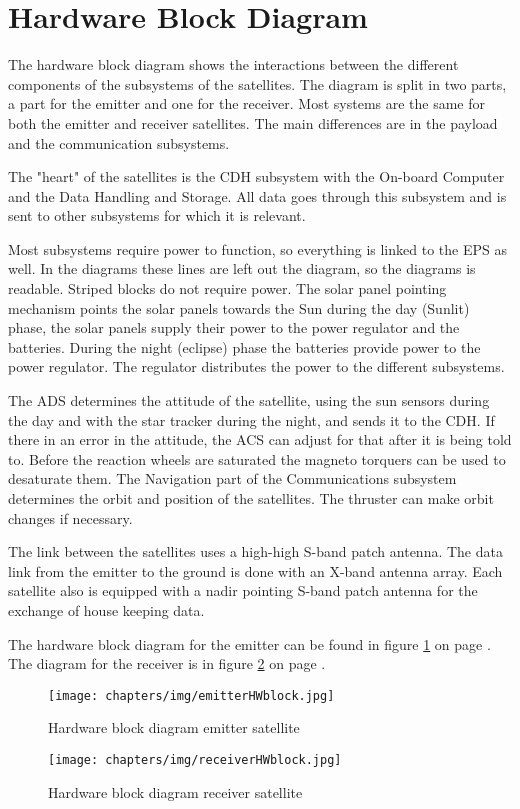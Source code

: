 \section{Hardware Block Diagram}
The hardware block diagram shows the interactions between the different components of the subsystems of the satellites. The diagram is split in two parts, a part for the emitter and one for the receiver. Most systems are the same for both the emitter and receiver satellites. The main differences are in the payload and the communication subsystems.

The "heart" of the satellites is the \ac{CDH} subsystem with the On-board Computer and the Data Handling and Storage. All data goes through this subsystem and is sent to other subsystems for which it is relevant. 

Most subsystems require power to function, so everything is linked to the \ac{EPS} as well. In the diagrams these lines are left out the diagram, so the diagrams is readable. Striped blocks do not require power. The solar panel pointing mechanism points the solar panels towards the Sun during the day (Sunlit) phase, the solar panels supply their power to the power regulator and the batteries. During the night (eclipse) phase the batteries provide power to the power regulator. The regulator distributes the power to the different subsystems.

The \ac{ADS} determines the attitude of the satellite, using the sun sensors during the day and with the star tracker during the night, and sends it to the \ac{CDH}. If there in an error in the attitude, the \ac{ACS} can adjust for that after it is being told to. Before the reaction wheels are saturated the magneto torquers can be used to desaturate them. The Navigation part of the Communications subsystem determines the orbit and position of the satellites. The thruster can make orbit changes if necessary.

The link between the satellites uses a high-high S-band patch antenna. The data link from the emitter to the ground is done with an X-band antenna array. Each satellite also is equipped with a nadir pointing S-band patch antenna for the exchange of house keeping data.

The hardware block diagram for the emitter can be found in figure \ref{HWblockemitter} on page \pageref{HWblockemitter}. The diagram for the receiver is in figure \ref{HWblockreceiver} on page \pageref{HWblockreceiver}.

\begin{figure}
\centering
\texttt{[image: chapters/img/emitterHWblock.jpg]}
\caption{Hardware block diagram emitter satellite}
\label{HWblockemitter}
\end{figure}

\begin{figure}
\centering
\texttt{[image: chapters/img/receiverHWblock.jpg]}
\caption{Hardware block diagram receiver satellite}
\label{HWblockreceiver}
\end{figure}